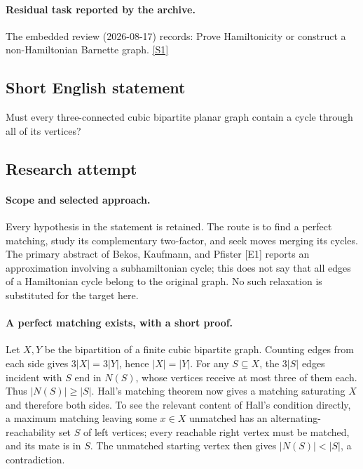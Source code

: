 \documentclass[11pt,a4paper]{article}
\newcommand{\sref}[2]{\hyperlink{source:#1:#2}{[S#2]}}
\begin{document}
\paragraph{Residual task reported by the archive.}

The embedded review (2026-08-17) records: Prove Hamiltonicity or construct a non-Hamiltonian Barnette graph. \sref{1414}{1}

\subsection{Short English statement}

Must every three-connected cubic bipartite planar graph contain a cycle through all of its vertices?

\subsection{Research attempt}

\paragraph{Scope and selected approach.}
Every hypothesis in the statement is retained. The route is to find a
perfect matching, study its complementary two-factor, and seek moves
merging its cycles. The primary abstract of Bekos, Kaufmann, and Pfister
[E1] reports an approximation involving a subhamiltonian cycle; this
does not say that all edges of a Hamiltonian cycle belong to the
original graph. No such relaxation is substituted for the target here.

\paragraph{A perfect matching exists, with a short proof.}
Let $X,Y$ be the bipartition of a finite cubic bipartite graph. Counting
edges from each side gives $3|X|=3|Y|$, hence $|X|=|Y|$. For any
$S\subseteq X$, the $3|S|$ edges incident with $S$ end in $N(S)$,
whose vertices receive at most three of them each. Thus
$|N(S)|\ge|S|$. Hall's matching theorem now gives a matching saturating
$X$ and therefore both sides. To see the relevant content of Hall's
condition directly, a maximum matching leaving some $x\in X$
unmatched has an alternating-reachability set $S$ of left vertices;
every reachable right vertex must be matched, and its mate is in $S$.
The unmatched starting vertex then gives $|N(S)|<|S|$, a contradiction.
\end{document}
